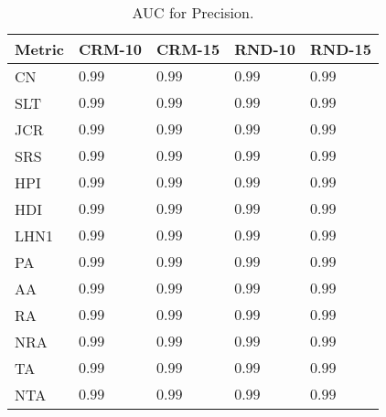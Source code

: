 \begin{table}[h]
	\centering
	\begin{tabular}{l l l l l}
	\toprule
	\textbf{Metric} & \textbf{CRM-10} & \textbf{CRM-15} & \textbf{RND-10} & \textbf{RND-15}\\
	\midrule
		CN & $0.99$ & $0.99$ & $0.99$ & $0.99$ \\
		SLT  & $0.99$ & $0.99$ & $0.99$ & $0.99$ \\
		JCR  & $0.99$ & $0.99$ & $0.99$ & $0.99$ \\
		SRS   & $0.99$ & $0.99$ & $0.99$ & $0.99$ \\
		HPI  & $0.99$ & $0.99$ & $0.99$ & $0.99$ \\
		HDI  & $0.99$ & $0.99$ & $0.99$ & $0.99$ \\
		LHN1  & $0.99$ & $0.99$ & $0.99$ & $0.99$ \\
		PA  & $0.99$ & $0.99$ & $0.99$ & $0.99$ \\
		AA  & $0.99$ & $0.99$ & $0.99$ & $0.99$ \\
		RA  & $0.99$ & $0.99$ & $0.99$ & $0.99$ \\
		NRA  & $0.99$ & $0.99$ & $0.99$ & $0.99$ \\
		TA  & $0.99$ & $0.99$ & $0.99$ & $0.99$ \\
		NTA  & $0.99$ & $0.99$ & $0.99$ & $0.99$ \\
	\bottomrule
	\end{tabular}
	\label{tab:auc-prediction}
	\caption{AUC for Precision.}
\end{table}	
     


